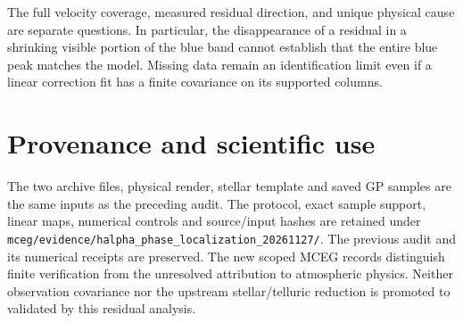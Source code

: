 \documentclass[11pt]{article}
\begin{document}
The full velocity coverage, measured residual direction, and unique physical
cause are separate questions. In particular, the disappearance of a residual
in a shrinking visible portion of the blue band cannot establish that the
entire blue peak matches the model. Missing data remain an identification
limit even if a linear correction fit has a finite covariance on its supported
columns.

\section{Provenance and scientific use}
The two archive files, physical render, stellar template and saved GP samples
are the same inputs as the preceding audit. The protocol, exact sample
support, linear maps, numerical controls and source/input hashes are retained
under \texttt{mceg/evidence/halpha\_phase\_localization\_20261127/}.
The previous audit and its numerical receipts are preserved. The new scoped
MCEG records distinguish finite verification from the unresolved attribution
to atmospheric physics. Neither observation covariance nor the upstream
stellar/telluric reduction is promoted to validated by this residual analysis.
\end{document}
